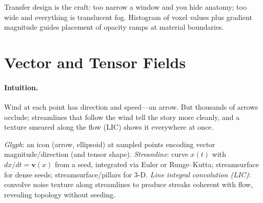 Transfer design is the craft: too narrow a window and you hide anatomy; too wide and everything is translucent fog. Histogram of voxel values plus gradient magnitude guides placement of opacity ramps at material boundaries.

\section{Vector and Tensor Fields}
\label{sec:vector}
\paragraph{Intuition.} Wind at each point has direction and speed---an arrow. But thousands of arrows occlude; streamlines that follow the wind tell the story more cleanly, and a texture smeared along the flow (LIC) shows it everywhere at once.

\begin{definition}\label{def:vector-vis}
\emph{Glyph}: an icon (arrow, ellipsoid) at sampled points encoding vector magnitude/direction (and tensor shape). \emph{Streamline}: curve $x(t)$ with $dx/dt=\mathbf{v}(x)$ from a seed, integrated via Euler or Runge--Kutta; streamsurface for dense seeds; streamsurface/pillars for 3-D. \emph{Line integral convolution (LIC)}: convolve noise texture along streamlines to produce streaks coherent with flow, revealing topology without seeding.
\end{definition}

